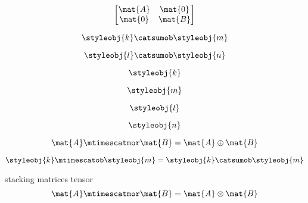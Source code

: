 {\begin{forslides}
        \begin{equation}
            \label{eq:parallelism-029}
            \begin{bmatrix}
                \mat{A} & \mat{0} \\
                \mat{0} & \mat{B}
            \end{bmatrix}
        \end{equation}

        \begin{equation}
            \label{eq:parallelism-030}
            \styleobj{k} \catsumob \styleobj{m}
        \end{equation}

        \begin{equation}
            \label{eq:parallelism-031}
            \styleobj{l} \catsumob \styleobj{n}
        \end{equation}

        \begin{equation}
            \label{eq:parallelism-032}
            \styleobj{k}
        \end{equation}

        \begin{equation}
            \label{eq:parallelism-033}
            \styleobj{m}
        \end{equation}

        \begin{equation}
            \label{eq:parallelism-034}
            \styleobj{l}
        \end{equation}

        \begin{equation}
            \label{eq:parallelism-035}
            \styleobj{n}
        \end{equation}

        \begin{equation}
            \label{eq:parallelism-036}
            \mat{A} \mtimescatmor \mat{B} = \mat{A} \oplus \mat{B}
        \end{equation}

        \begin{equation}
            \label{eq:parallelism-037}
            \styleobj{k} \mtimescatob \styleobj{m} = \styleobj{k} \catsumob \styleobj{m}
        \end{equation}

        stacking matrices tensor
        \begin{equation}
            \label{eq:parallelism-038}
            \mat{A} \mtimescatmor \mat{B} = \mat{A} \otimes \mat{B}
        \end{equation}


\end{forslides}}
